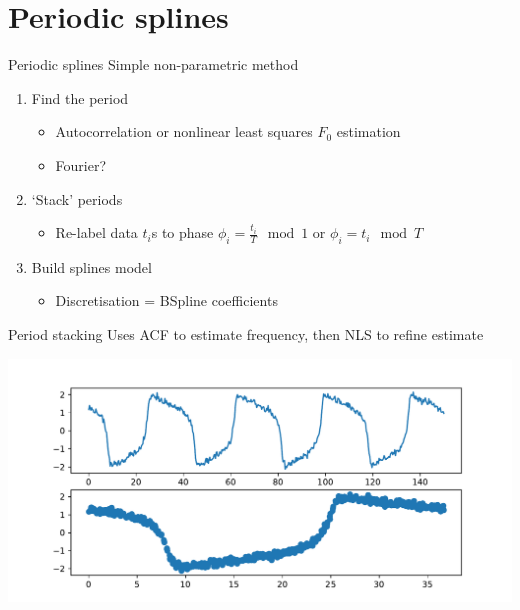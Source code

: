 \documentclass[presentation]{beamer}
\begin{document}
\section{Periodic splines}
\label{sec:orgb277688}
\begin{frame}[label={sec:orgc51d184}]{Periodic splines}
Simple non-parametric method
\vfill
\begin{enumerate}[<+->]
\item Find the period
\begin{itemize}
\item Autocorrelation or nonlinear least squares \(F_0\) estimation
\item Fourier?
\end{itemize}
\item `Stack' periods
\begin{itemize}
\item Re-label data \(t_i\)s to phase \(\phi_i = \frac{t_i}{T} \mod 1\) or \(\phi_i = t_i \mod T\)
\end{itemize}
\item Build splines model
\begin{itemize}
\item Discretisation = BSpline coefficients
\end{itemize}
\end{enumerate}
\end{frame}

\begin{frame}[label={sec:org6c770d6}]{Period stacking}
Uses ACF to estimate frequency, then NLS to refine estimate

\begin{center}
\includegraphics[width=.9\linewidth]{./period_stack.pdf}
\end{center}
\end{frame}
\end{document}
